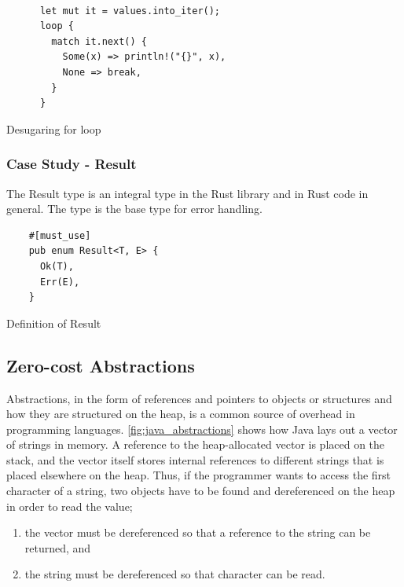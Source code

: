 \begin{minipage}[b]{0.5\linewidth}
  \begin{listing}[H]
    \begin{verbatim}

      let mut it = values.into_iter();
      loop {
        match it.next() {
          Some(x) => println!("{}", x),
          None => break,
        }
      }

    \end{verbatim}

    \caption{Desugaring for loop}
    \label{lst:rust:desugared-for}
  \end{listing}
\end{minipage}

\subsubsection{Case Study - Result}

The Result type is an integral type in the Rust library and in Rust code in general.
The type is the base type for error handling.

\begin{listing}[H]
  \begin{verbatim}
    #[must_use]
    pub enum Result<T, E> {
      Ok(T),
      Err(E),
    }
\end{verbatim}
\caption{Definition of Result}
\label{lst:rust:result}
\end{listing}

\subsection{Zero-cost Abstractions}
\label{chap:zero_cost_abstractions}

Abstractions, in the form of references and pointers to objects or structures and how they are
structured on the heap, is a common source of overhead in programming languages.
\autoref{fig:java_abstractions}  shows how Java lays out a vector of
strings in memory.
A reference to the heap-allocated vector is placed on the stack, and the vector itself stores internal references to different strings that is placed elsewhere on the heap.
Thus, if the programmer wants to access the first character of a string, two objects have to be found and dereferenced on the heap in order to read the value;

\begin{enumerate}
  \item the vector must be dereferenced so that a reference to the string can be returned, and
  \item the string must be dereferenced so that character can be read.
\end{enumerate}


